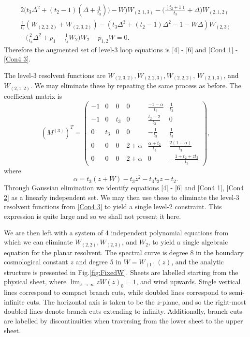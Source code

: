 %
\begin{multline}
    \label{Con4 3}
    2\bigg(t_3 \Delta^2 + (t_2 -1)\left(\Delta + \frac{1}{t_3}\right)\bigg) - W\bigg)W_{(2,1,3)} - \bigg(\frac{(t_2+1)}{t_3} + \Delta\bigg)W_{(2,1,2)} \\
    \frac{1}{t_3} (W_{(2,2,2)} + W_{(2,3,2)}) - (t_3\Delta^3 + (t_2 -1)\Delta^2 - 1 - W\Delta)W_{(2,3)} \\
    - \bigg(\frac{2}{t_3} \Delta^2 + p_1 - \frac{1}{t_3} W_{2}\bigg)W_{2} - p_{1,2} W = 0.
\end{multline}
%
Therefore the augmented set of level-3 loop equations is \eqref{4} - \eqref{6} and \eqref{Con4 1} -
\eqref{Con4 3}.

The level-3 resolvent functions are $W_{(2,3,2)}, W_{(2,2,3)}, W_{(2,2,2)}$, $W_{(2,1,3)}$, and
$W_{(2,1,2)}$. We may eliminate these by repeating the same process as before. The coefficient
matrix is
%
\begin{equation}
    (M^{(3)})^T =
    \begin{pmatrix}
        -1 & 0   & 0   & 0          & \frac{-1-\alpha}{t_3}  & \frac{1}{t_3} \\
        -1 & 0   & t_3 & 0          & \frac{t_2 -2}{t_3}     & 0 \\
        0  & t_3 & 0   & 0          & -\frac{1}{t_3}         & \frac{1}{t_3} \\
        0  & 0   & 0   & 2 + \alpha & \frac{\alpha+t_2}{t_3} & \frac{2(1-\alpha)}{t_3} \\
        0  & 0   & 0   & 2+\alpha   & 0                      & - \frac{1+ t_2 + z t_3}{t_3}
    \end{pmatrix},
\end{equation}
%
where
%
\begin{equation}
    \alpha = t_3(z+W) - t_3 z^2 - t_3 t_2 z - t_2 .
\end{equation}
%
Through Gaussian elimination we identify equations \eqref{4} - \eqref{6} and \eqref{Con4 1},
\eqref{Con4 2} as a linearly independent set. We may then use these to eliminate the level-3
resolvent functions from \eqref{Con4 3} to yield a single level-2 constraint. This expression is
quite large and so we shall not present it here.

We are then left with a system of 4 independent polynomial equations from which we can eliminate
$W_{(2,2)}, W_{(2,3)}$, and $W_{2}$, to yield a single algebraic equation for the planar resolvent.
The spectral curve is degree 8 in the boundary cosmological constant $z$ and degree 5 in $W =
    W_{(1)}(z)$, and the analytic structure is presented in Fig.\ref{fig:FixedW}. Sheets are labelled
starting from the physical sheet, where $\lim_{z\rightarrow\infty}z W(z)_0 = 1$, and wind upwards.
Single vertical lines correspond to compact branch cuts, while doubled lines correspond to
semi-infinite cuts. The horizontal axis is taken to be the $z$-plane, and so the right-most doubled
lines denote branch cuts extending to infinity. Additionally, branch cuts are labelled by
discontinuities when traversing from the lower sheet to the upper sheet.

